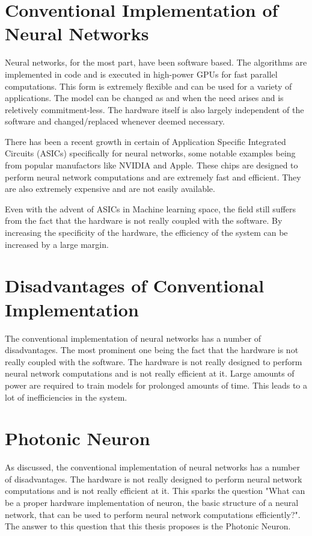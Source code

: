 \section{Conventional Implementation of Neural Networks}

Neural networks, for the most part, have been software based. The algorithms are implemented in code and is executed in high-power GPUs for fast parallel computations. This form is extremely flexible and can be used for a variety of applications. The model can be changed as and when the need arises and is reletively commitment-less. The hardware itself is also largely independent of the software and changed/replaced whenever deemed necessary.

There has been a recent growth in certain of Application Specific Integrated Circuits (ASICs) specifically for neural networks, some notable examples being from popular manufactors like NVIDIA \cite{NVIDIAT4Tensor} and Apple. These chips are designed to perform neural network computations and are extremely fast and efficient. They are also extremely expensive and are not easily available.

Even with the advent of ASICs in Machine learning space, the field still suffers from the fact that the hardware is not really coupled with the software. By increasing the specificity of the hardware, the efficiency of the system can be increased by a large margin.

\section{Disadvantages of Conventional Implementation}

The conventional implementation of neural networks has a number of disadvantages. The most prominent one being the fact that the hardware is not really coupled with the software. The hardware is not really designed to perform neural network computations and is not really efficient at it. Large amounts of power are required to train models for prolonged amounts of time. This leads to a lot of inefficiencies in the system.

\section{Photonic Neuron}

As discussed, the conventional implementation of neural networks has a number of disadvantages. The hardware is not really designed to perform neural network computations and is not really efficient at it. This sparks the question "What can be a proper hardware implementation of neuron, the basic structure of a neural network, that can be used to perform neural network computations efficiently?". The answer to this question that this thesis proposes is the Photonic Neuron.

